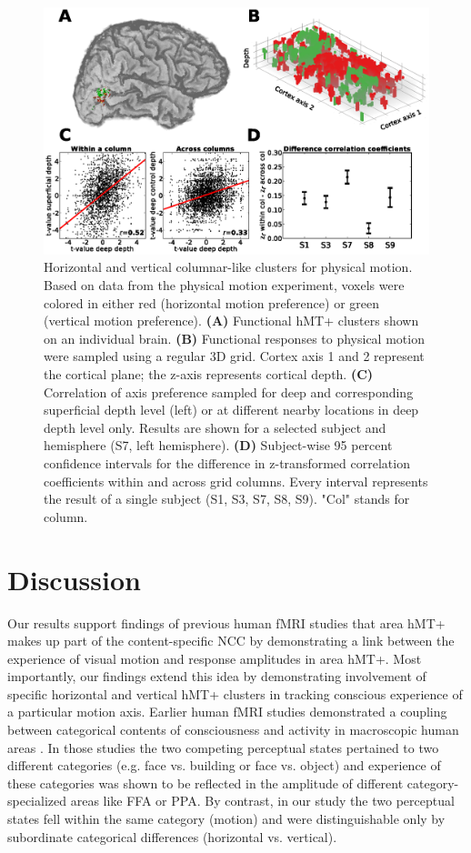 \begin{figure}[htb!]
\centering
\includegraphics[width=\textwidth]{figures/chapter_03/fig4.eps}
\caption{Horizontal and vertical columnar-like clusters for physical motion. Based on data from the physical motion experiment, voxels were colored in either red (horizontal motion preference) or green (vertical motion preference). \textbf{(A)} Functional hMT+ clusters shown on an individual brain. \textbf{(B)} Functional responses to physical motion were sampled using a regular 3D grid. Cortex axis 1 and 2 represent the cortical plane; the z-axis represents cortical depth. \textbf{(C)} Correlation of axis preference sampled for deep and corresponding superficial depth level (left) or at different nearby locations in deep depth level only. Results are shown for a selected subject and hemisphere (S7, left hemisphere). \textbf{(D)} Subject-wise 95 percent confidence intervals for the difference in z-transformed correlation coefficients within and across grid columns. Every interval represents the result of a single subject (S1, S3, S7, S8, S9). "Col" stands for column.}
\label{fig:clusters}
\end{figure}

\section{Discussion}
Our results support findings of previous human fMRI studies \parencite{Sterzer2002,Muckli2002,Castelo-Branco2002, Kamitani2006, Brouwer2007} that area hMT+ makes up part of the content-specific NCC by demonstrating a link between the experience of visual motion and response amplitudes in area hMT+. Most importantly, our findings extend this idea by demonstrating involvement of specific horizontal and vertical hMT+ clusters in tracking conscious experience of a particular motion axis. Earlier human fMRI studies demonstrated a coupling between categorical contents of consciousness and activity in macroscopic human areas \parencite{Tong1998,Hasson2001,Andrews2002}. In those studies the two competing perceptual states pertained to two different categories (e.g. face vs. building or face vs. object) and experience of these categories was shown to be reflected in the amplitude of different category-specialized areas like FFA or PPA. By contrast, in our study the two perceptual states fell within the same category (motion) and were distinguishable only by subordinate categorical differences (horizontal vs. vertical).

